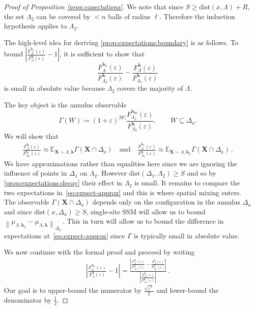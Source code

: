 \documentclass[10pt]{amsart}
\theoremstyle{definition}
\theoremstyle{remark}
\newcommand{\bX}{\mathbf{X}}
\newcommand{\dist}{\mathrm{dist}}
\newcommand{\E}{\mathbb{E}}
\newcommand{\region}{\Lambda}
\newcommand{\activities}{\pmb{\lambda}}
\newcommand{\size}[1]{\left\lvert#1\right\rvert}
\newcommand{\absolute}[1]{\left\lvert#1\right\rvert}
\newcommand{\epsbound}{\varepsilon^{*}}
\begin{document}
\begin{proof}[Proof of Proposition \ref{prop:expectations}]
		We note that since \(S\ge \dist(x,\region)+R\), the set \(\region_2\) can be covered by \(<n\) balls of radius \(\ell\). Therefore the
		induction hypothesis applies to \(\region_2\). 
		
		
		The high-level idea for deriving \ref{prop:expectations:boundary} is as follows. To bound $\absolute{\frac{F_{\region}^{\activities_x}(\varepsilon)}{F_{\region}^{\activities}(\varepsilon)} - 1}$, it is sufficient to show that  $$\frac{F_{\region}^{\activities_x}(\varepsilon)}{F_{\region_2}^{\activities}(\varepsilon)} - \frac{F_{\region}^{\activities}(\varepsilon)}{F_{\region_2}^{\activities}(\varepsilon)}$$ is small in absolute value because $\Lambda_2$ covers the majority of $\Lambda$. 
		
		
		
		The key object is the annulus observable
		\[
		\Gamma(W)
		\coloneqq
		(1+\varepsilon)^{\size W}
		\frac{F_{\region_2}^{\activities_W}(\varepsilon)}
		{F_{\region_2}^{\activities}(\varepsilon)},
		\qquad
		W\subseteq \Delta_a.
		\]
		We will show that
		\begin{align}\label{eq:expect-approx}
			\frac{F_{\region}^{\activities}(\varepsilon)}
			{F_{\region_2}^{\activities}(\varepsilon)}
			\approx
			\E_{\bX\sim\region,\activities}
			\Gamma(\bX\cap\Delta_a)
			\quad
			\text{and}
			\quad
			\frac{F_{\region}^{\activities_x}(\varepsilon)}
			{F_{\region_2}^{\activities}(\varepsilon)}
			\approx
			\E_{\bX\sim\region,\activities_x}
			\Gamma(\bX\cap\Delta_a)\, .
		\end{align}
		We have approximations rather than equalities here since we are ignoring the influence of points in $\Delta_1$ on $\region_2$. However $\dist(\Delta_1, \Lambda_2)\geq S$ and so by \ref{prop:expectations:decay} their effect in $\region_2$ is small. 
		It remains to compare the two expectations in~\eqref{eq:expect-approx} and this is where spatial mixing enters. The observable \(\Gamma(\bX\cap\Delta_a)\)
		depends only on the configuration in the annulus \(\Delta_a\) and since
		\(\dist(x,\Delta_a)\ge S\), single-site SSM will allow us to bound $\left\|
		\mu_{\region,\activities_x}
		-
		\mu_{\region,\activities}
		\right\|_{\Delta_a}\,.$
		This in turn will allow us to bound the difference in expectations at~\eqref{eq:expect-approx} since $\Gamma$ is typically small in absolute value. 
		
		
		We now continue with the formal proof and proceed by writing
		\begin{align}\label{eq:numerator-denominator}
			\absolute{\frac{F_{\region}^{\activities_x}(\varepsilon)}{F_{\region}^{\activities}(\varepsilon)} - 1}
			= 
			\frac{\absolute{\frac{F_{\region}^{\activities_x}(\varepsilon)}{F_{\region_2}^{\activities}(\varepsilon)} - \frac{F_{\region}^{\activities}(\varepsilon)}{F_{\region_2}^{\activities}(\varepsilon)}}}{\absolute{\frac{F_{\region}^{\activities}(\varepsilon)}{F_{\region_2}^{\activities}(\varepsilon)}}} \, .
		\end{align}
		Our goal is to upper-bound the numerator by $\frac{\sqrt{\epsbound}}{2}$ and lower-bound the denominator by $\frac{1}{2}$.
		

\end{proof}
\end{document}
